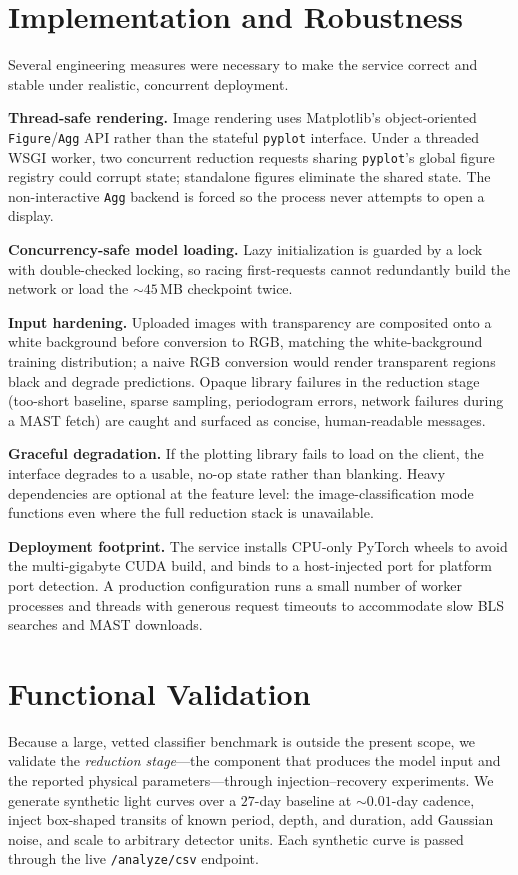\documentclass[twocolumn,10pt]{article}
\newcommand{\code}[1]{\texttt{\small #1}}
\begin{document}
\section{Implementation and Robustness}
Several engineering measures were necessary to make the service correct and stable
under realistic, concurrent deployment.

\textbf{Thread-safe rendering.} Image rendering uses Matplotlib's object-oriented
\code{Figure}/\code{Agg} API rather than the stateful \code{pyplot} interface.
Under a threaded WSGI worker, two concurrent reduction requests sharing
\code{pyplot}'s global figure registry could corrupt state; standalone figures
eliminate the shared state. The non-interactive \code{Agg} backend is forced so the
process never attempts to open a display.

\textbf{Concurrency-safe model loading.} Lazy initialization is guarded by a lock
with double-checked locking, so racing first-requests cannot redundantly build the
network or load the ${\sim}45$\,MB checkpoint twice.

\textbf{Input hardening.} Uploaded images with transparency are composited onto a
white background before conversion to RGB, matching the white-background training
distribution; a naive RGB conversion would render transparent regions black and
degrade predictions. Opaque library failures in the reduction stage (too-short
baseline, sparse sampling, periodogram errors, network failures during a MAST
fetch) are caught and surfaced as concise, human-readable messages.

\textbf{Graceful degradation.} If the plotting library fails to load on the client,
the interface degrades to a usable, no-op state rather than blanking. Heavy
dependencies are optional at the feature level: the image-classification mode
functions even where the full reduction stack is unavailable.

\textbf{Deployment footprint.} The service installs CPU-only PyTorch wheels to
avoid the multi-gigabyte CUDA build, and binds to a host-injected port for
platform port detection. A production configuration runs a small number of worker
processes and threads with generous request timeouts to accommodate slow BLS
searches and MAST downloads.

\section{Functional Validation}
Because a large, vetted classifier benchmark is outside the present scope, we
validate the \emph{reduction stage}---the component that produces the model input
and the reported physical parameters---through injection--recovery experiments.
We generate synthetic light curves over a $27$-day baseline at ${\sim}0.01$-day
cadence, inject box-shaped transits of known period, depth, and duration, add
Gaussian noise, and scale to arbitrary detector units. Each synthetic curve is
passed through the live \code{/analyze/csv} endpoint.
\end{document}
